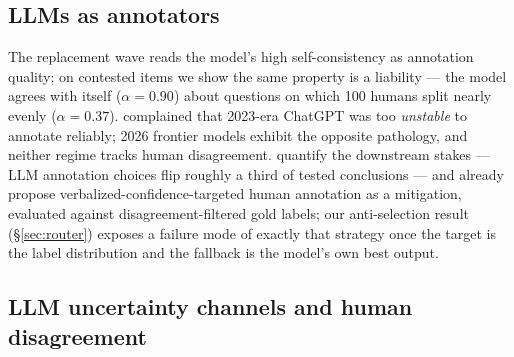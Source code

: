 \documentclass[11pt]{article}
\begin{document}
\subsection{LLMs as annotators}
\label{sec:related-annotators}

The replacement wave \citep{gilardi2023chatgpt,tornberg2023chatgpt} reads the model's high self-consistency as annotation quality; on contested items we show the same property is a liability --- the model agrees with itself ($\alpha = 0.90$) about questions on which 100 humans split nearly evenly ($\alpha = 0.37$). \citet{reiss2023testing} complained that 2023-era ChatGPT was too \emph{unstable} to annotate reliably; 2026 frontier models exhibit the opposite pathology, and neither regime tracks human disagreement. \citet{baumann2025hacking} quantify the downstream stakes --- LLM annotation choices flip roughly a third of tested conclusions --- and already propose verbalized-confidence-targeted human annotation as a mitigation, evaluated against disagreement-filtered gold labels; our anti-selection result (\S\ref{sec:router}) exposes a failure mode of exactly that strategy once the target is the label distribution and the fallback is the model's own best output.

\subsection{LLM uncertainty channels and human disagreement}
\label{sec:related-channels}
\end{document}
